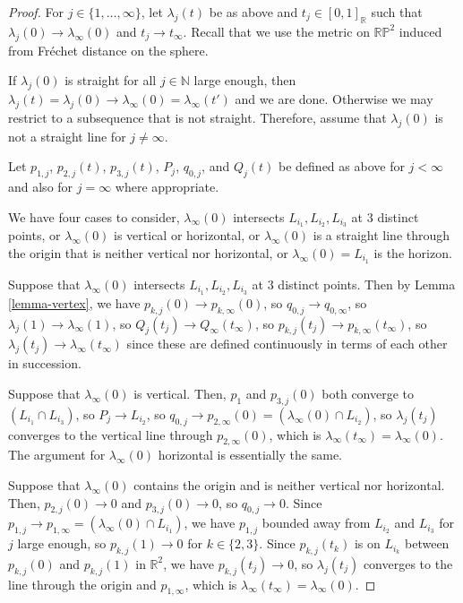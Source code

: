\documentclass[11pt]{article}
\numberwithin{equation}{section}
\theoremstyle{remark}
\let\mb\mathbb
\newcommand{\projplane}{\mb{RP}^2}
\begin{document}
\begin{proof}
For $j \in \{1,\dots,\infty\}$, let $\lambda_j(t)$ be as above and $t_j \in [0,1]_\mb{R}$ such that $\lambda_j(0) \to \lambda_\infty(0)$ and $t_j \to t_\infty$.
Recall that we use the metric on $\projplane$ induced from Fréchet distance on the sphere.

If $\lambda_j(0)$ is straight for all $j \in \mb{N}$ large enough, then $\lambda_j(t) = \lambda_j(0) \to \lambda_\infty(0) = \lambda_\infty(t')$ and we are done.
Otherwise we may restrict to a subsequence that is not straight.
Therefore, assume that $\lambda_j(0)$ is not a straight line for $j\neq \infty$.

Let $p_{1,j}$, $p_{2,j}(t)$, $p_{3,j}(t)$, $P_j$, $q_{0,j}$, and $Q_{j}(t)$ be defined as above for $j < \infty$ and also for $j=\infty$ where appropriate.

We have four cases to consider, $\lambda_\infty(0)$ intersects $L_{i_1},L_{i_2},L_{i_3}$ at $3$ distinct points, or $\lambda_\infty(0)$ is vertical or horizontal, or $\lambda_\infty(0)$ is a straight line through the origin that is neither vertical nor horizontal, or $\lambda_\infty(0) = L_{i_1}$ is the horizon.

Suppose that $\lambda_\infty(0)$ intersects $L_{i_1},L_{i_2},L_{i_3}$ at $3$ distinct points. Then by Lemma \ref{lemma-vertex}, we have $p_{k,j}(0) \to p_{k,\infty}(0)$, so $q_{0,j} \to q_{0,\infty}$, so $\lambda_j(1) \to \lambda_\infty(1)$, so $Q_{j}(t_j) \to Q_{\infty}(t_\infty)$, so $p_{k,j}(t_j) \to p_{k,\infty}(t_\infty)$, so $\lambda_j(t_j) \to \lambda_\infty(t_\infty)$ since these are defined continuously in terms of each other in succession.

Suppose that $\lambda_\infty(0)$ is vertical. Then, $p_1$ and $p_{3,j}(0)$ both converge to $(L_{i_1} \cap L_{i_3})$, so $P_j \to L_{i_2}$, so $q_{0,j} \to p_{2,\infty}(0) = (\lambda_\infty(0) \cap L_{i_2})$, so $\lambda_j(t_j)$ converges to the vertical line through $p_{2,\infty}(0)$, which is $\lambda_\infty(t_\infty) = \lambda_\infty(0)$.
The argument for $\lambda_\infty(0)$ horizontal is essentially the same.

Suppose that $\lambda_\infty(0)$ contains the origin and is neither vertical nor horizontal. Then, $p_{2,j}(0) \to 0$ and $p_{3,j}(0) \to 0$, so $q_{0,j} \to 0$. Since $p_{1,j} \to p_{1,\infty} = (\lambda_\infty(0) \cap L_{i_1})$, we have $p_{1,j}$ bounded away from $L_{i_2}$ and $L_{i_3}$ for $j$ large enough, so $p_{k,j}(1) \to 0$ for $k \in \{2,3\}$. Since $p_{k,j}(t_k)$ is on $L_{i_k}$ between $p_{k,j}(0)$ and $p_{k,j}(1)$ in $\mb{R}^2$, we have $p_{k,j}(t_j) \to 0$, so $\lambda_j(t_j)$ converges to the line through the origin and $p_{1,\infty}$, which is $\lambda_\infty(t_\infty) = \lambda_\infty(0)$.


\end{proof}
\end{document}
